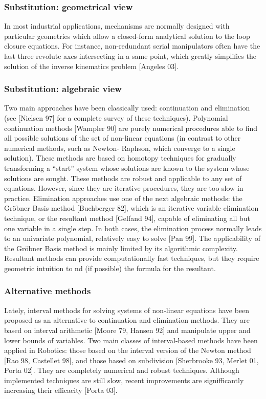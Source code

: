 \documentclass{book}
\begin{document}
\subsubsection{Substitution: geometrical view}

In most industrial applications, mechanisms are normally designed with
particular geometries which allow a closed-form analytical solution to the loop closure
equations. For instance, non-redundant serial manipulators often have the last three
revolute axes intersecting in a same point, which greatly simplifies the solution of the
inverse kinematics problem [Angeles 03].

\subsubsection{Substitution: algebraic view}

Two main approaches have been classically used: continuation and elimination (see [Nielsen 97] for a complete survey of these techniques). Polynomial continuation methods [Wampler 90] are purely numerical procedures able to find all possible solutions of the set of non-linear equations (in contrast to other numerical methods, such as Newton- Raphson, which converge to a single solution). These methods are based on homotopy techniques for gradually transforming a ``start'' system whose solutions are known to the system whose solutions are sought. These methods are robust and applicable to any set of equations. However, since they are iterative procedures, they are too slow in practice. Elimination approaches use one of the next algebraic methods: the Gr\"obner Basis method [Buchberger 82], which is an iterative variable elimination technique, or the resultant method [Gelfand 94], capable of eliminating all but one variable in a single step. In both cases, the elimination process normally leads to an univariate polynomial, relatively easy to solve [Pan 99]. The applicability of the Gr\"obner Basis method is mainly limited by its algorithmic complexity. Resultant methods can provide computationally fast techniques, but they require geometric intuition to nd (if possible) the formula for the resultant.

\subsubsection{Alternative methods}

Lately, interval methods for solving systems of non-linear equations have been proposed
as an alternative to continuation and elimination methods. They are based on interval
arithmetic [Moore 79, Hansen 92] and manipulate upper and lower bounds of variables.
Two main classes of interval-based methods have been applied in Robotics: those based
on the interval version of the Newton method [Rao 98, Castellet 98], and those based
on subdivision [Sherbrooke 93, Merlet 01, Porta 02]. They are completely numerical and
robust techniques. Although implemented techniques are still slow, recent improvements
are signifficantly increasing their efficacity [Porta 03].
\end{document}
